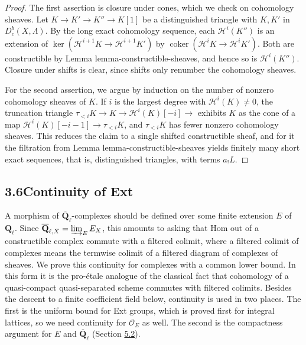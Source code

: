 \documentclass[11pt]{article}
\providecommand{\Dbc}{}\renewcommand{\Dbc}{D^b_c}
\providecommand{\QbarX}{}\renewcommand{\QbarX}{\overline{\mathbf Q}_{\ell,X}}
\providecommand{\coker}{}\renewcommand{\coker}{\operatorname{coker}}
\begin{document}
\begin{proof}[{Proof}]\label{bp254}%
The first assertion is closure under cones, which we check on cohomology sheaves. Let \(K\to K'\to K''\to K[1]\) be a distinguished triangle with \(K,K'\) in \(\Dbc(X,\Lambda)\). By the long exact cohomology sequence, each \(\mathcal H^i(K'')\) is an extension of \(\ker(\mathcal H^{i+1}K\to\mathcal H^{i+1}K')\) by \(\coker(\mathcal H^iK\to\mathcal H^iK')\). Both are constructible by Lemma lemma-constructible-sheaves, and hence so is \(\mathcal H^i(K'')\). Closure under shifts is clear, since shifts only renumber the cohomology sheaves.

For the second assertion, we argue by induction on the number of nonzero cohomology sheaves of \(K\). If \(i\) is the largest degree with \(\mathcal H^i(K)\ne0\), the truncation triangle \(\tau_{<i}K\to K\to\mathcal H^i(K)[-i]\to\) exhibits \(K\) as the cone of a map \(\mathcal H^i(K)[-i-1]\to\tau_{<i}K\), and \(\tau_{<i}K\) has fewer nonzero cohomology sheaves. This reduces the claim to a single shifted constructible sheaf, and for it the filtration from Lemma lemma-constructible-sheaves yields finitely many short exact sequences, that is, distinguished triangles, with terms \(a_!L\).
\end{proof}


\subsection*{\texorpdfstring{3.6\quad Continuity of Ext}{3.6 Continuity of Ext}}
\label{bp255}%
\label{bp256}%
A morphism of \(\overline{\mathbf Q}_\ell\)-complexes should be defined over some finite extension \(E\) of \(\mathbf Q_\ell\). Since \(\QbarX=\varinjlim_EE_X\), this amounts to asking that Hom out of a constructible complex commute with a filtered colimit, where a filtered colimit of complexes means the termwise colimit of a filtered diagram of complexes of sheaves. We prove this continuity for complexes with a common lower bound. In this form it is the pro-étale analogue of the classical fact that cohomology of a quasi-compact quasi-separated scheme commutes with filtered colimits. Besides the descent to a finite coefficient field below, continuity is used in two places. The first is the uniform bound for Ext groups, which is proved first for integral lattices, so we need continuity for \(\mathcal O_E\) as well. The second is the compactness argument for \(E\) and \(\overline{\mathbf Q}_\ell\) (Section \hyperref[bp415]{5.2}).
\end{document}
